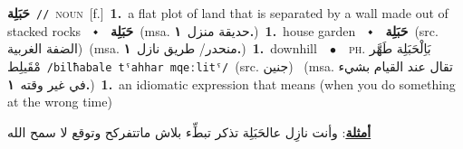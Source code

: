 \documentclass[10pt,a4paper,twoside]{article} %
\begin{document}
\begin{multicols}{2}
{\setlength\topsep{0pt}\textbf{\foreignlanguage{arabic}{حَبَلِة}}\ {\color{gray}\texttt{//}\color{black}}\ \textsc{noun}\ [f.]\ \textbf{1.}~a flat plot of land that is separated by a wall made out of stacked rocks\ \ $\smblkdiamond$\ \ \setlength\topsep{0pt}\textbf{\foreignlanguage{arabic}{حَبَلِة}}\ \color{gray}(msa. \foreignlanguage{arabic}{حديقة منزل}~\foreignlanguage{arabic}{\textbf{١.}})\color{black}\ \textbf{1.}~house garden\ \ $\smblkdiamond$\ \ \setlength\topsep{0pt}\textbf{\foreignlanguage{arabic}{حَبَلِة}}\ (src. \color{gray}\foreignlanguage{arabic}{الضفة الغربية}\color{black})\ \color{gray}(msa. \foreignlanguage{arabic}{منحدر/ طريق نازل}~\foreignlanguage{arabic}{\textbf{١.}})\color{black}\ \textbf{1.}~downhill\ \ $\bullet$\ \ \textsc{ph.} \color{gray} \foreignlanguage{arabic}{بَاِلْحَبَلِة طَهَّر مْقَيلِط}\color{black}\ {\color{gray}\texttt{/{\sffamily bilħabale tˤahhar mqeːlitˤ}/}\color{black}}\ \color{gray}(src. \foreignlanguage{arabic}{جنين})\color{black}\ \color{gray} (msa. \foreignlanguage{arabic}{تقال عند القيام بشيء في غير وقته}~\foreignlanguage{arabic}{\textbf{١.}})\color{black}\ \textbf{1.}~an idiomatic expression that means (when you do something at the wrong time)\  \begin{flushright}\color{gray}\foreignlanguage{arabic}{\textbf{\underline{\foreignlanguage{arabic}{أمثلة}}}: وأنت نازِل عالحَبَلِة تذكر تبطِّء بلاش ماتتفركح وتوقع لا سمح الله}\end{flushright}\color{black}} \vspace{2mm}


\end{multicols}
\end{document}

